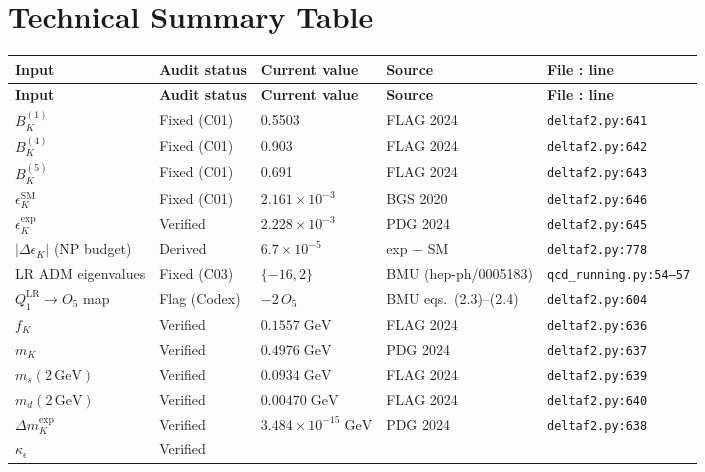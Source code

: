 \documentclass[11pt]{article}
\newcommand{\eK}{\epsilon_K}
\newcommand{\DeK}{\Delta\eK}
\begin{document}
\section{Technical Summary Table}
\label{sec:summary-table}

\begin{longtable}{@{}p{2.6cm}p{2cm}p{2.2cm}p{2.2cm}p{3.8cm}@{}}
\toprule
\textbf{Input} & \textbf{Audit status} &
  \textbf{Current value} & \textbf{Source} &
  \textbf{File : line} \\
\midrule
\endfirsthead
\toprule
\textbf{Input} & \textbf{Audit status} &
  \textbf{Current value} & \textbf{Source} &
  \textbf{File : line} \\
\midrule
\endhead
$B_K^{(1)}$ &
  Fixed (C01) &
  0.5503 &
  FLAG 2024 &
  \texttt{deltaf2.py:641} \\
$B_K^{(4)}$ &
  Fixed (C01) &
  0.903 &
  FLAG 2024 &
  \texttt{deltaf2.py:642} \\
$B_K^{(5)}$ &
  Fixed (C01) &
  0.691 &
  FLAG 2024 &
  \texttt{deltaf2.py:643} \\
$\eK^{\mathrm{SM}}$ &
  Fixed (C01) &
  $2.161\times10^{-3}$ &
  BGS 2020 &
  \texttt{deltaf2.py:646} \\
$\eK^{\mathrm{exp}}$ &
  Verified &
  $2.228\times10^{-3}$ &
  PDG 2024 &
  \texttt{deltaf2.py:645} \\
$|\DeK|$ (NP budget) &
  Derived &
  $6.7\times10^{-5}$ &
  exp $-$ SM &
  \texttt{deltaf2.py:778} \\
LR ADM eigenvalues &
  Fixed (C03) &
  $\{-16, 2\}$ &
  BMU (hep-ph/0005183) &
  \texttt{qcd\_running.py:54--57} \\
$Q_1^{\mathrm{LR}} \!\to\! O_5$ map &
  Flag (Codex) &
  $-2\,O_5$ &
  BMU eqs.~(2.3)--(2.4) &
  \texttt{deltaf2.py:604} \\
$f_K$ &
  Verified &
  $0.1557\;\mathrm{GeV}$ &
  FLAG 2024 &
  \texttt{deltaf2.py:636} \\
$m_K$ &
  Verified &
  $0.4976\;\mathrm{GeV}$ &
  PDG 2024 &
  \texttt{deltaf2.py:637} \\
$m_s(2\,\mathrm{GeV})$ &
  Verified &
  $0.0934\;\mathrm{GeV}$ &
  FLAG 2024 &
  \texttt{deltaf2.py:639} \\
$m_d(2\,\mathrm{GeV})$ &
  Verified &
  $0.00470\;\mathrm{GeV}$ &
  FLAG 2024 &
  \texttt{deltaf2.py:640} \\
$\Delta m_K^{\mathrm{exp}}$ &
  Verified &
  $3.484\!\times\!10^{-15}\;\mathrm{GeV}$ &
  PDG 2024 &
  \texttt{deltaf2.py:638} \\
$\kappa_\epsilon$ &
  Verified &

\end{longtable}
\end{document}
